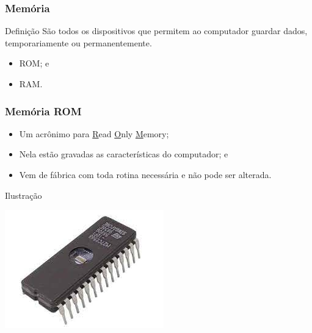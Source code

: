 \documentclass[aspectratio=169]{beamer} %
\begin{document}
\begin{frame}
	\frametitle{Memória}
	
	\begin{block}{Defini\c cão}
		São todos os dispositivos que permitem ao computador guardar dados, temporariamente ou permanentemente.
	\end{block}\vfill
	
	\begin{itemize}
		\item ROM; e
		\item RAM.
	\end{itemize}
\end{frame}

\begin{frame}
	\frametitle{Memória ROM}
		
	\begin{itemize}
		\item Um acrônimo para \underline{R}ead \underline{O}nly \underline{M}emory;
		\item Nela estão gravadas as características do computador; e
		\item Vem de fábrica com toda rotina necessária e não pode ser alterada.
	\end{itemize}\vfill
	
	\begin{exampleblock}{Ilustra\c cão}
		\begin{center}
			\includegraphics[scale=0.4]{img/rom}
		\end{center}		
	\end{exampleblock}
\end{frame}
\end{document}
